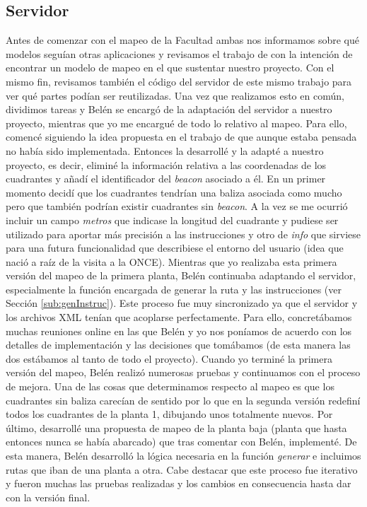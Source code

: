 \subsection{Servidor}
Antes de comenzar con el mapeo de la Facultad ambas nos informamos sobre qué modelos seguían otras aplicaciones y revisamos el trabajo de \cite{TFGguia} con la intención de encontrar un modelo de mapeo en el que sustentar nuestro proyecto. Con el mismo fin, revisamos también el código del servidor de este mismo trabajo para ver qué partes podían ser reutilizadas. Una vez que realizamos esto en común, dividimos tareas y Belén se encargó de la adaptación del servidor a nuestro proyecto, mientras que yo me encargué de todo lo relativo al mapeo. Para ello, comencé siguiendo la idea propuesta en el trabajo de \cite{TFGguia} que aunque estaba pensada no había sido implementada. Entonces la desarrollé y la adapté a nuestro proyecto, es decir, eliminé la información relativa a las coordenadas de los cuadrantes y añadí el identificador del \textit{beacon} asociado a él. En un primer momento decidí que los cuadrantes tendrían una baliza asociada como mucho pero que también podrían existir cuadrantes sin \textit{beacon}. A la vez se me ocurrió incluir un campo \textit{metros} que indicase la longitud del cuadrante y pudiese ser utilizado para aportar más precisión a las instrucciones y otro de \textit{info} que sirviese para una futura funcionalidad que describiese el entorno del usuario (idea que nació a raíz de la visita a la ONCE). Mientras que yo realizaba esta primera versión del mapeo de la primera planta, Belén continuaba adaptando el servidor, especialmente la función encargada de generar la ruta y las instrucciones (ver Sección \ref{sub:genInstruc}). Este proceso fue muy sincronizado ya que el servidor y los archivos XML tenían que acoplarse perfectamente. Para ello, concretábamos muchas reuniones online en las que Belén y yo nos poníamos de acuerdo con los detalles de implementación y las decisiones que tomábamos (de esta manera las dos estábamos al tanto de todo el proyecto). Cuando yo terminé la primera versión del mapeo, Belén realizó numerosas pruebas y continuamos con el proceso de mejora. Una de las cosas que determinamos respecto al mapeo es que los cuadrantes sin baliza carecían de sentido por lo que en la segunda versión redefiní todos los cuadrantes de la planta 1, dibujando unos totalmente nuevos. Por último, desarrollé una propuesta de mapeo de la planta baja (planta que hasta entonces nunca se había abarcado) que tras comentar con Belén, implementé. De esta manera, Belén desarrolló la lógica necesaria en la función \textit{generar} e incluimos rutas que iban de una planta a otra. Cabe destacar que este proceso fue iterativo y fueron muchas las pruebas realizadas y los cambios en consecuencia hasta dar con la versión final.

